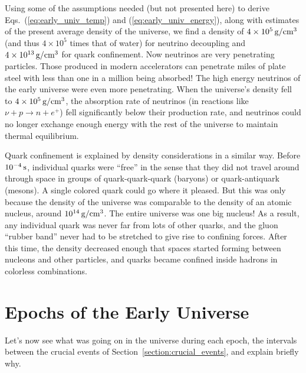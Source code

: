 Using some of the assumptions needed (but not presented here) to
derive Eqs.~(\ref{eq:early_univ_temp}) and
(\ref{eq:early_univ_energy}), along with estimates of the present
average density of the universe, we find a density of $4\times
10^5\,\mbox{g/cm$^3$}$ (and thus $4\times 10^5$ times that of water) for
neutrino decoupling and $4\times 10^{13}\,\mbox{g/cm$^3$}$ for quark
confinement.  Now neutrinos are very penetrating particles. Those
produced in modern accelerators can penetrate miles of plate steel
with less than one in a million being absorbed!  The high energy
neutrinos of the early universe were even more penetrating.  When the
universe's density fell to $4\times 10^5\,\mbox{g/cm$^3$}$, the absorption
rate of neutrinos (in reactions like $\nu+p \to n + e^+$) fell
significantly below their production rate, and neutrinos could no
longer exchange enough energy with the rest of the universe to
maintain thermal equilibrium.

Quark confinement is explained by density considerations in a similar
way.  Before $10^{-4}\,\mbox{s}$, individual quarks were ``free'' in
the sense that they did not travel around through space in groups of
quark-quark-quark (baryons) or quark-antiquark (mesons).  A single
colored quark could go where it pleased.  But this was only because
the density of the universe was comparable to the density of an atomic
nucleus, around $10^{14}\,\mbox{g/cm$^3$}$.  The entire universe was
one big nucleus!  As a result, any individual quark was never far from
lots of other quarks, and the gluon ``rubber band'' never had to be
stretched to give rise to confining forces. After this time, the
density decreased enough that spaces started forming between nucleons
and other particles, and quarks became confined inside hadrons in
colorless combinations.

\section{Epochs of the Early Universe}

Let's now see what was going on in the universe during each epoch, the
intervals between the crucial events of
Section~\ref{section:crucial_events}, and explain briefly why.

